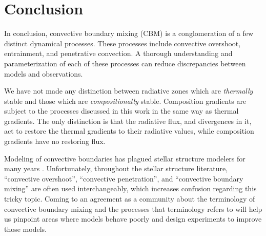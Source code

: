 \section{Conclusion}
\label{sec:conclusions}
In conclusion, convective boundary mixing (CBM) is a conglomeration of a few distinct dynamical processes.
These processes include convective overshoot, entrainment, and penetrative convection.
A thorough understanding and parameterization of each of these processes can reduce discrepancies between models and observations.

We have not made any distinction between radiative zones which are \emph{thermally} stable and those which are \emph{compositionally} stable.
Composition gradients are subject to the processes discussed in this work in the same way as thermal gradients.
The only distinction is that the radiative flux, and divergences in it, act to restore the thermal gradients to their radiative values, while composition gradients have no restoring flux.

Modeling of convective boundaries has plagued stellar structure modelers for many years \citep{mesa1, mesa4, mesa5}.
Unfortunately, throughout the stellar structure literature, ``convective overshoot'', ``convective penetration'', and ``convective boundary mixing'' are often used interchangeably, which increases confusion regarding this tricky topic.
Coming to an agreement as a community about the terminology of convective boundary mixing and the processes that terminology refers to will help us pinpoint areas where models behave poorly and design experiments to improve those models.


